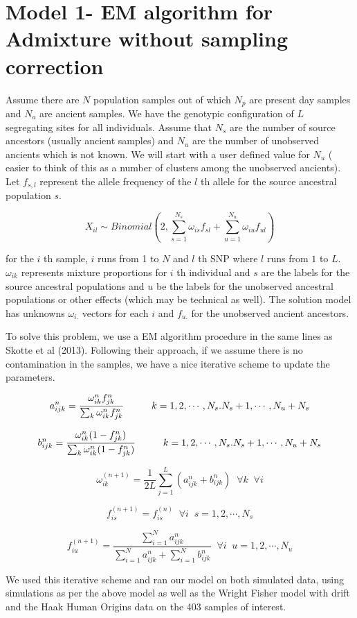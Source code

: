 \documentclass[11pt]{article}
\begin{document}
\section{Model 1- EM algorithm for Admixture without sampling correction}

Assume there are $N$ population samples out of which $N_p$ are present day samples and $N_a$ are ancient samples. We have the genotypic configuration of $L$ segregating sites for all individuals.  Assume that $N_s$ are the number of source ancestors (usually ancient samples) and $N_u$ are the number of unobserved ancients which is not known. We will start with a user defined value for $N_u$ ( easier to think of this as a number of clusters among the unobserved ancients). Let $f_{s,l}$ represent the allele frequency of the $l$ th allele for the source ancestral population $s$.

$$ X_{il} \sim Binomial (2, \sum_{s=1}^{N_s} \omega_{is} f_{sl} + \sum_{u=1}^{N_u} \omega_{iu} f_{ul}) $$

for the $i$ th sample, $i$ runs from 1 to $N$ and $l$ th SNP  where $l$ runs from $1$ to $L$. $\omega_{ik}$ represents mixture proportions for $i$ th individual and $s$ are the labels for the source ancestral populations  and $u$  be the labels for the unobserved ancestral populations or other effects (which may be technical as well).  The solution model has unknowns $\omega_{i.}$ vectors for each $i$ and $f_{u.}$ for the unobserved ancient ancestors. 

To solve this problem, we use a EM algorithm procedure in the same lines as Skotte et al (2013).  Following their approach, if we assume there is no contamination in the samples, we have a nice iterative scheme to update the parameters. 

$$ a^{n}_{ijk} = \frac{\omega^{n}_{ik} f^{n}_{jk}}{\sum_k \omega^{n}_{ik} f^{n}_{jk}}  \hspace{1 cm} k=1,2,\cdots, N_s. N_s +1, \cdots, N_u+N_s $$

$$ b^{n}_{ijk} = \frac{\omega^{n}_{ik} (1-f^{n}_{jk})}{\sum_k \omega^{n}_{ik} (1-f^{n}_{jk})}  \hspace{1 cm} k=1,2,\cdots, N_s. N_s +1, \cdots, N_u+N_s $$

$$ \omega^{(n+1)}_{ik} = \frac{1}{2L} \sum_{j=1}^{L} ( a^{n}_{ijk} +  b^{n}_{ijk})  \;\; \forall k  \;\; \forall i$$

$$ f^{(n+1)}_{is} = f^{(n)}_{is}  \;\; \forall i  \;\; s=1,2, \cdots, N_s $$

$$ f^{(n+1)}_{iu} = \frac{\sum_{i=1}^{N} a^{n}_{ijk}}{\sum_{i=1}^{N} a^{n}_{ijk} + \sum_{i=1}^{N} b^{n}_{ijk}} \;\; \forall i  \;\; u=1,2, \cdots, N_u $$

We used this iterative scheme and ran our model on both simulated data, using simulations as per the above model as well as the Wright Fisher model with drift and the Haak Human Origins data on the 403 samples of interest. 
\end{document}
